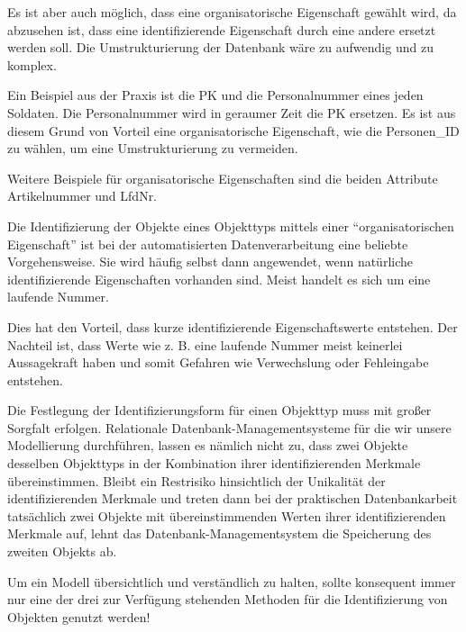           Es ist aber auch möglich, dass eine organisatorische Eigenschaft
          gewählt wird, da abzusehen ist, dass eine identifizierende
          Eigenschaft durch eine andere ersetzt werden soll. Die
          Umstrukturierung der Datenbank wäre zu aufwendig und zu komplex.

          Ein Beispiel aus der Praxis ist die PK und die Personalnummer eines
          jeden Soldaten. Die Personalnummer wird in geraumer Zeit die PK
          ersetzen. Es ist aus diesem Grund von Vorteil eine organisatorische
          Eigenschaft, wie die Personen\_ID zu wählen, um eine
          Umstrukturierung zu vermeiden.

          Weitere Beispiele für organisatorische Eigenschaften sind die beiden Attribute Artikelnummer und LfdNr.

          Die Identifizierung der Objekte eines Objekttyps mittels einer
					\enquote{organisatorischen Eigenschaft} ist bei der automatisierten
					Datenverarbeitung eine beliebte Vorgehensweise. Sie wird häufig
					selbst dann angewendet, wenn natürliche identifizierende
					Eigenschaften vorhanden sind. Meist handelt es sich um eine laufende
					Nummer.

					Dies hat den Vorteil, dass kurze identifizierende Eigenschaftswerte
					entstehen. Der Nachteil ist, dass Werte wie z. B. eine laufende
					Nummer meist keinerlei Aussagekraft haben und somit Gefahren wie
					Verwechslung oder Fehleingabe entstehen.

					Die Festlegung der Identifizierungsform für einen Objekttyp muss mit
					großer Sorgfalt erfolgen. Relationale Datenbank-Managementsysteme
					für die wir unsere Modellierung durch\-füh\-ren, lassen es
					nämlich nicht zu, dass zwei Objekte desselben Objekttyps in der
					Kombination ihrer identifizierenden Merkmale übereinstimmen. Bleibt
					ein Restrisiko hinsichtlich der Unikalität der identifizierenden
					Merkmale und treten dann bei der praktischen Datenbankarbeit
					tatsächlich zwei Objekte mit übereinstimmenden Werten ihrer
					identifizierenden Merkmale auf, lehnt das Datenbank-Managementsystem
					die Speicherung des zweiten Objekts ab.

					\begin{merke}
						Um ein Modell übersichtlich und verständlich zu halten, sollte
						konsequent immer nur eine der drei zur Verfügung stehenden
						Methoden für die Identifizierung von Objekten genutzt werden!
          \end{merke}
          
